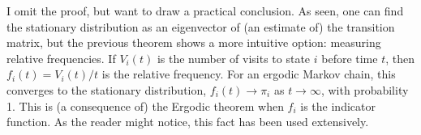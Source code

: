 \documentclass{../src/bcthesispart}
\begin{document}
I omit the proof, but want to draw a practical conclusion.
As seen, one can find the stationary distribution as an eigenvector of (an estimate of) the transition matrix, but the previous theorem shows a more intuitive option: measuring relative frequencies.
If $V_i(t)$ is the number of visits to state $i$ before time $t$, then $f_i(t) = V_i(t) / t$ is the relative frequency.
For an ergodic Markov chain, this converges to the stationary distribution,
$f_i(t) \to \pi_i$ as $t\to\infty$, with probability 1.
This is (a consequence of) the Ergodic theorem \parencite[][1.10.2]{Norris1997} when $f_i$ is the indicator function.
As the reader might notice, this fact has been used extensively.



\showbibliography
\end{document}
